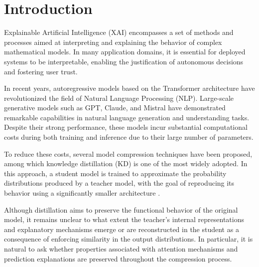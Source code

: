 \documentclass[conference]{IEEEtran}
\begin{document}
\section{Introduction}
Explainable Artificial Intelligence (XAI) encompasses a set of methods and processes aimed at interpreting and explaining the behavior of complex mathematical models. In many application domains, it is essential for deployed systems to be interpretable, enabling the justification of autonomous decisions and fostering user trust.

In recent years, autoregressive models based on the Transformer architecture have revolutionized the field of Natural Language Processing (NLP). Large-scale generative models such as GPT, Claude, and Mistral have demonstrated remarkable capabilities in natural language generation and understanding tasks. Despite their strong performance, these models incur substantial computational costs during both training and inference due to their large number of parameters.

To reduce these costs, several model compression techniques have been proposed, among which knowledge distillation (KD) is one of the most widely adopted. In this approach, a student model is trained to approximate the probability distributions produced by a teacher model, with the goal of reproducing its behavior using a significantly smaller architecture \cite{hinton2015distilling}.

Although distillation aims to preserve the functional behavior of the original model, it remains unclear to what extent the teacher's internal representations and explanatory mechanisms emerge or are reconstructed in the student as a consequence of enforcing similarity in the output distributions. In particular, it is natural to ask whether properties associated with attention mechanisms and prediction explanations are preserved throughout the compression process.
\end{document}
